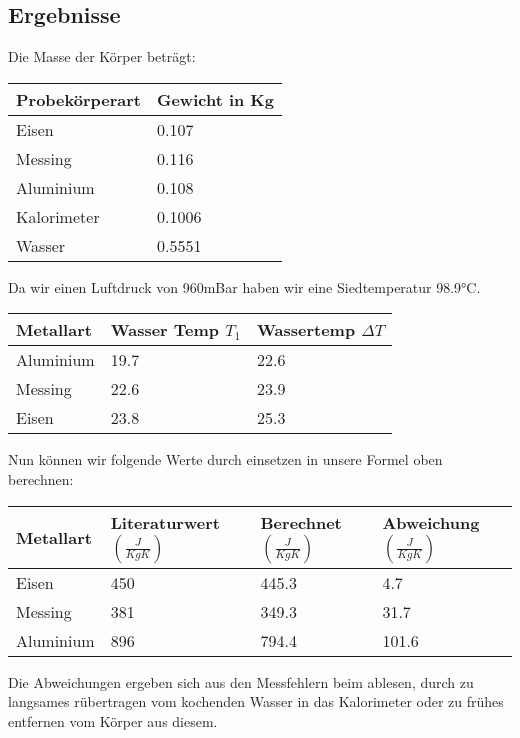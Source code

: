     \subsection{Ergebnisse}
	Die Masse der Körper beträgt:
	\begin{table}[H]
		\centering
		\begin{tabular}{|l|l|}
			\hline
		 	Probekörperart & Gewicht in Kg\\
			\hline
			Eisen & 0.107\\
			\hline
			Messing& 0.116\\
			\hline
			Aluminium& 0.108\\
			\hline
			Kalorimeter& 0.1006\\
			\hline
			Wasser& 0.5551\\
			\hline
		\end{tabular}
	\end{table}
	Da wir einen Luftdruck von 960mBar haben wir eine Siedtemperatur 98.9°C.
        \begin{table}[H]
            \centering
            \begin{tabular}{|l|l|l|}
                \hline
                Metallart  & Wasser Temp $T_{1}$ & Wassertemp $ \Delta T$\\
                \hline
                Aluminium& 19.7 & 22.6\\
                \hline
                Messing &  22.6  & 23.9 \\
                \hline
                Eisen& 23.8 & 25.3\\
                \hline
            \end{tabular}
        \end{table}
        Nun können wir folgende Werte durch einsetzen in unsere Formel oben berechnen:
        \begin{table}[H]
        	\centering
        	\begin{tabular}{|l|l|l|l|}
        		\hline
        		Metallart & Literaturwert $(\frac{J}{KgK})$ & Berechnet $(\frac{J}{KgK})$ & Abweichung $(\frac{J}{KgK})$ \\
        		\hline
        		Eisen& 450 & 445.3 & 4.7\\
        		\hline
        		Messing & 381& 349.3 & 31.7 \\
        		\hline
        		Aluminium& 896 & 794.4 & 101.6 \\
        		\hline
        	\end{tabular}
        \end{table}
Die Abweichungen ergeben sich aus den Messfehlern beim ablesen, durch zu langsames rübertragen vom  kochenden Wasser in das Kalorimeter oder zu frühes entfernen vom Körper aus diesem. 


